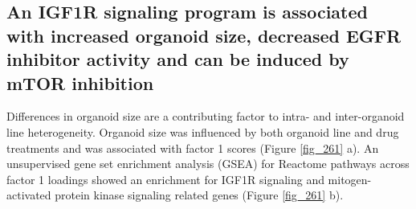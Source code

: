 \begin{flushleft}
\newpage
\section{An IGF1R signaling program is associated with increased organoid size, decreased EGFR inhibitor activity and can be induced by mTOR inhibition}

Differences in organoid size are a contributing factor to intra- and inter-organoid line heterogeneity. Organoid size was influenced by both organoid line and drug treatments and was associated with factor 1 scores (Figure \ref{fig_261} a). An unsupervised gene set enrichment analysis (GSEA) for Reactome pathways across factor 1 loadings showed an enrichment for IGF1R signaling and mitogen-activated protein kinase signaling related genes (Figure \ref{fig_261} b). 


\end{flushleft}
